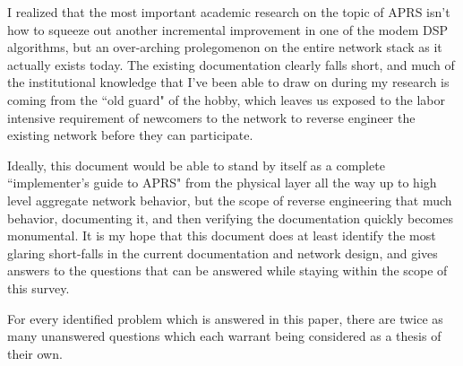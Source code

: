 I realized that the most important academic research on the topic of APRS isn't
how to squeeze out another incremental improvement in one of the modem DSP
algorithms, but an over-arching prolegomenon on the entire network stack as it 
actually exists today. The existing documentation clearly falls short, and
much of the institutional knowledge that I've been able to draw on during 
my research is coming from the ``old guard" of the hobby, which leaves us exposed
to the labor intensive requirement of newcomers to the network to 
reverse engineer the existing network before they can participate.

Ideally, this document would be able to stand by itself as a complete 
``implementer's guide to APRS" from the physical layer all the way up to high level
aggregate network behavior, but the scope of reverse engineering that much
behavior, documenting it, and then verifying the documentation quickly becomes
monumental. 
It is my hope that this document does at least identify the most glaring 
short-falls in the current documentation and network design, and gives answers to
the questions that can be answered while staying within the scope of this survey.

For every identified problem which is answered in this paper, there
are twice as many unanswered questions which each warrant being considered 
as a thesis of their own.
